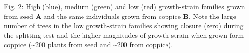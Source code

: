 Fig. 2: High (blue), medium (green) and low (red) growth-strain families grown from seed \textbf{A} and the same individuals grown from coppice \textbf{B}. Note the large number of trees in the low growth-strain families showing closure (zero) during the splitting test and the higher magnitudes of growth-strain when grown form coppice (\sim200 plants from seed and \sim200 from coppice).